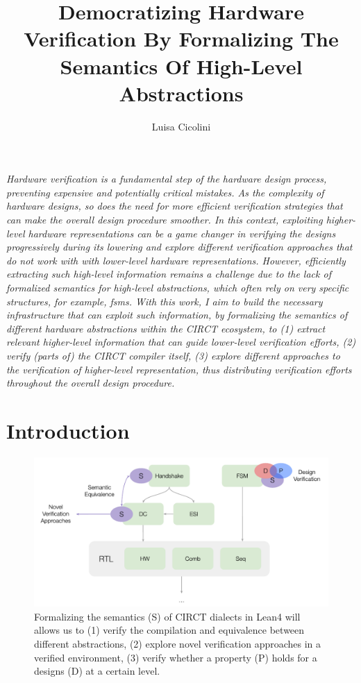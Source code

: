 \documentclass[sigconf,authorversion,nonacm, 11pt]{acmart}
\begin{document}
\title{Democratizing Hardware Verification By Formalizing The Semantics Of High-Level Abstractions}

\author{Luisa Cicolini}

\maketitle
\thispagestyle{empty}

\textit{
    Hardware verification is a fundamental step of the hardware design process, preventing expensive and potentially critical 
    mistakes.
    As the complexity of hardware designs, so does the need for more efficient verification strategies that can 
    make the overall design procedure smoother.
    In this context, exploiting higher-level hardware representations can be a game changer in verifying the designs 
    progressively during its lowering and explore different verification approaches that do not work with 
    with lower-level hardware representations. 
    However, efficiently extracting such high-level information remains a challenge due to the lack of formalized semantics  
    for high-level abstractions, which often rely on very specific structures, for example, \acp{fsm}.
    With this work, I aim to build the necessary infrastructure that can exploit such information,
    by formalizing the semantics of different hardware abstractions within the CIRCT ecosystem, to 
    (1) extract relevant higher-level information that can guide lower-level verification efforts, 
    (2) verify (parts of) the CIRCT compiler itself, 
    (3) explore different approaches to the verification of higher-level representation, thus distributing verification 
    efforts throughout the overall design procedure. 
}


\section{Introduction}

\begin{figure}[ht]
    \includegraphics[scale=0.8]{semantics.pdf}
    \caption{Formalizing the semantics (S) of CIRCT dialects in Lean4 will allows us to (1) verify the compilation and equivalence 
    between different abstractions, (2) explore novel verification approaches in a verified environment, (3) verify whether a property 
    (P) holds for a designs (D) at a certain level.}
\end{figure}
\end{document}
